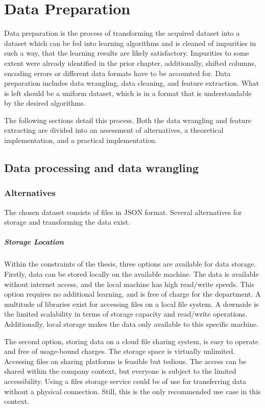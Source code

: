 \chapter{Data Preparation}
    Data preparation is the process of transforming the acquired dataset into a dataset which can be fed into learning algorithms and is cleaned of impurities in such a way, that the learning results are likely satisfactory. Impurities to some extent were already identified in the prior chapter, additionally, shifted columns, encoding errors or different data formats have to be accounted for.
	Data preparation includes data wrangling, data cleaning, and feature extraction. What is left should be a uniform dataset, which is in a format that is understandable by the desired algorithms.
	
	The following sections detail this process. Both the data wrangling and feature extracting are divided into an assessment of alternatives, a theoretical implementation, and a practical implementation.	
	
	\section{Data processing and data wrangling}

        \subsection{Alternatives}
        The chosen dataset consists of files in \ac{JSON} format. Several alternatives for storage and transforming the data exist. 
        
        \paragraph{Storage Location}
        Within the constraints of the thesis, three options are available for data storage. Firstly, data can be stored locally on the available machine. The data is available without internet access, and the local machine has high read/write speeds. This option requires no additional learning, and is free of charge for the department. A multitude of libraries exist for accessing files on a local file system. A downside is the limited scalability in terms of storage capacity and read/write operations. Additionally, local storage makes the data only available to this specific machine.
        
        The second option, storing data on a cloud file sharing system, is easy to operate and free of usage-bound charges. The storage space is virtually unlimited. Accessing files on sharing platforms is feasible but tedious. The access can be shared within the company context, but everyone is subject to the limited accessibility. Using a files storage service could be of use for transferring data without a physical connection. Still, this is the only recommended use case in this context.
        
